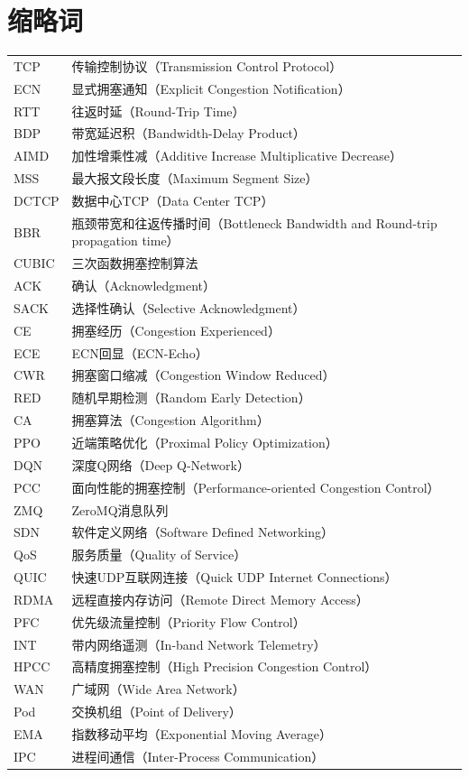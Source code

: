 \section*{缩略词}
\begin{supertabular}{p{3cm}p{10cm}}
TCP & 传输控制协议（Transmission Control Protocol） \\
ECN & 显式拥塞通知（Explicit Congestion Notification） \\
RTT & 往返时延（Round-Trip Time） \\
BDP & 带宽延迟积（Bandwidth-Delay Product） \\
AIMD & 加性增乘性减（Additive Increase Multiplicative Decrease） \\
MSS & 最大报文段长度（Maximum Segment Size） \\
DCTCP & 数据中心TCP（Data Center TCP） \\
BBR & 瓶颈带宽和往返传播时间（Bottleneck Bandwidth and Round-trip propagation time） \\
CUBIC & 三次函数拥塞控制算法 \\
ACK & 确认（Acknowledgment） \\
SACK & 选择性确认（Selective Acknowledgment） \\
CE & 拥塞经历（Congestion Experienced） \\
ECE & ECN回显（ECN-Echo） \\
CWR & 拥塞窗口缩减（Congestion Window Reduced） \\
RED & 随机早期检测（Random Early Detection） \\
CA & 拥塞算法（Congestion Algorithm） \\
PPO & 近端策略优化（Proximal Policy Optimization） \\
DQN & 深度Q网络（Deep Q-Network） \\
PCC & 面向性能的拥塞控制（Performance-oriented Congestion Control） \\
ZMQ & ZeroMQ消息队列 \\
SDN & 软件定义网络（Software Defined Networking） \\
QoS & 服务质量（Quality of Service） \\
QUIC & 快速UDP互联网连接（Quick UDP Internet Connections） \\
RDMA & 远程直接内存访问（Remote Direct Memory Access） \\
PFC & 优先级流量控制（Priority Flow Control） \\
INT & 带内网络遥测（In-band Network Telemetry） \\
HPCC & 高精度拥塞控制（High Precision Congestion Control） \\
WAN & 广域网（Wide Area Network） \\
Pod & 交换机组（Point of Delivery） \\
EMA & 指数移动平均（Exponential Moving Average） \\
IPC & 进程间通信（Inter-Process Communication） \\
\end{supertabular}
